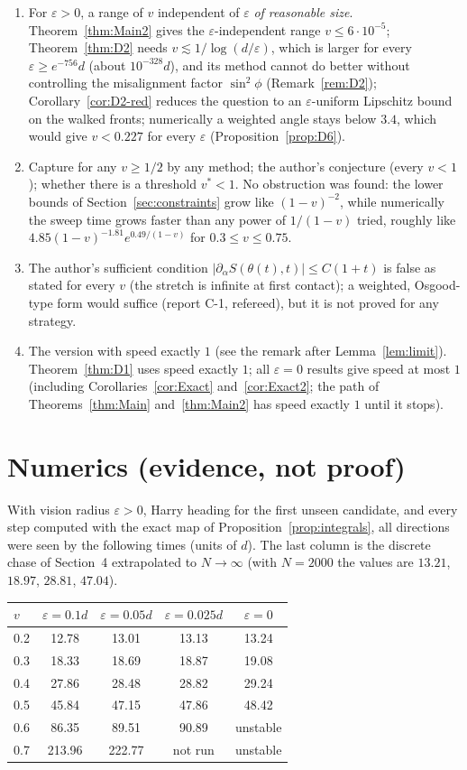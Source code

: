 \documentclass[11pt]{article}
\theoremstyle{remark}\newtheorem{remark}{Remark}
\begin{document}
\begin{enumerate}
\item For $\varepsilon>0$, a range of $v$ independent of $\varepsilon$ \emph{of reasonable size}. Theorem~\ref{thm:Main2} gives the
$\varepsilon$-independent range $v\le6\cdot10^{-5}$; Theorem~\ref{thm:D2} needs $v\lesssim1/\log(d/\varepsilon)$, which is larger
for every $\varepsilon\ge e^{-756}d$ (about $10^{-328}d$), and its method cannot do
better without controlling the misalignment factor $\sin^2\phi$ (Remark~\ref{rem:D2}); Corollary~\ref{cor:D2-red} reduces the question to an
$\varepsilon$-uniform Lipschitz bound on the walked fronts;
numerically a weighted angle stays below $3.4$, which would give $v<0.227$ for every $\varepsilon$ (Proposition~\ref{prop:D6}).
\item Capture for any $v\ge1/2$ by any method; the author's conjecture (every $v<1$); whether there is a threshold $v^*<1$.
No obstruction was found: the lower bounds of Section~\ref{sec:constraints} grow like $(1-v)^{-2}$, while numerically the sweep time
grows faster than any power of $1/(1-v)$ tried, roughly like $4.85(1-v)^{-1.81}e^{0.49/(1-v)}$ for $0.3\le v\le0.75$.
\item The author's sufficient condition $|\partial_\alpha S(\theta(t),t)|\le C(1+t)$ is false as stated for every $v$ (the stretch is infinite at first
contact); a weighted, Osgood-type form would suffice (report C-1, refereed), but it is not proved for any strategy.
\item The version with speed exactly $1$ (see the remark after Lemma~\ref{lem:limit}). Theorem~\ref{thm:D1} uses speed exactly $1$;
all $\varepsilon=0$ results give speed at most $1$ (including Corollaries~\ref{cor:Exact} and~\ref{cor:Exact2}; the path of Theorems~\ref{thm:Main} and~\ref{thm:Main2} has
speed exactly $1$ until it stops).
\end{enumerate}

\section{Numerics (evidence, not proof)}\label{sec:numerics}
With vision radius $\varepsilon>0$, Harry heading for the first unseen candidate, and every step computed with the exact map
of Proposition~\ref{prop:integrals}, all directions were seen by the following times (units of $d$). The last column is the
discrete chase of Section~4 extrapolated to $N\to\infty$ (with $N=2000$ the values are $13.21$, $18.97$, $28.81$, $47.04$).
\begin{center}
\begin{tabular}{@{}lcccc@{}}
\toprule
$v$ & $\varepsilon=0.1d$ & $\varepsilon=0.05d$ & $\varepsilon=0.025d$ & $\varepsilon=0$\\
\midrule
0.2 & 12.78 & 13.01 & 13.13 & 13.24\\
0.3 & 18.33 & 18.69 & 18.87 & 19.08\\
0.4 & 27.86 & 28.48 & 28.82 & 29.24\\
0.5 & 45.84 & 47.15 & 47.86 & 48.42\\
0.6 & 86.35 & 89.51 & 90.89 & unstable\\
0.7 & 213.96 & 222.77 & not run & unstable\\
\bottomrule
\end{tabular}
\end{center}
\end{document}
